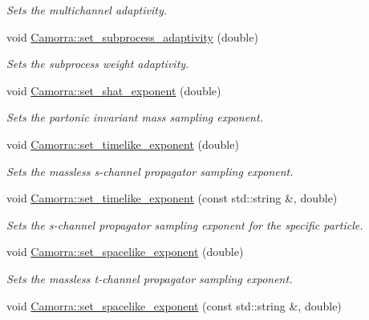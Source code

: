 \begin{DoxyCompactItemize}
\begin{DoxyCompactList}\small\item\em Sets the multichannel adaptivity. \end{DoxyCompactList}\item 
\hypertarget{a00800_ab925ee281e5dcc7918b910d9bf4776a1}{
void \hyperlink{a00800_ab925ee281e5dcc7918b910d9bf4776a1}{Camorra::set\_\-subprocess\_\-adaptivity} (double)}
\label{a00800_ab925ee281e5dcc7918b910d9bf4776a1}

\begin{DoxyCompactList}\small\item\em Sets the subprocess weight adaptivity. \end{DoxyCompactList}\item 
\hypertarget{a00800_a96dd98282eadc82c686136675e018496}{
void \hyperlink{a00800_a96dd98282eadc82c686136675e018496}{Camorra::set\_\-shat\_\-exponent} (double)}
\label{a00800_a96dd98282eadc82c686136675e018496}

\begin{DoxyCompactList}\small\item\em Sets the partonic invariant mass sampling exponent. \end{DoxyCompactList}\item 
\hypertarget{a00800_ad3d0d6efe216f895b234d2837d05aa2b}{
void \hyperlink{a00800_ad3d0d6efe216f895b234d2837d05aa2b}{Camorra::set\_\-timelike\_\-exponent} (double)}
\label{a00800_ad3d0d6efe216f895b234d2837d05aa2b}

\begin{DoxyCompactList}\small\item\em Sets the massless s-\/channel propagator sampling exponent. \end{DoxyCompactList}\item 
void \hyperlink{a00800_ac25eb02fc3fa90f512f9788ee8b753d1}{Camorra::set\_\-timelike\_\-exponent} (const std::string \&, double)
\begin{DoxyCompactList}\small\item\em Sets the s-\/channel propagator sampling exponent for the specific particle. \end{DoxyCompactList}\item 
\hypertarget{a00800_a74a73247c6a606042f46091e82e67750}{
void \hyperlink{a00800_a74a73247c6a606042f46091e82e67750}{Camorra::set\_\-spacelike\_\-exponent} (double)}
\label{a00800_a74a73247c6a606042f46091e82e67750}

\begin{DoxyCompactList}\small\item\em Sets the massless t-\/channel propagator sampling exponent. \end{DoxyCompactList}\item 
\hypertarget{a00800_aa470a42f8c0f6f75a6e11c99be73f201}{
void \hyperlink{a00800_aa470a42f8c0f6f75a6e11c99be73f201}{Camorra::set\_\-spacelike\_\-exponent} (const std::string \&, double)}
\label{a00800_aa470a42f8c0f6f75a6e11c99be73f201}


\end{DoxyCompactItemize}
